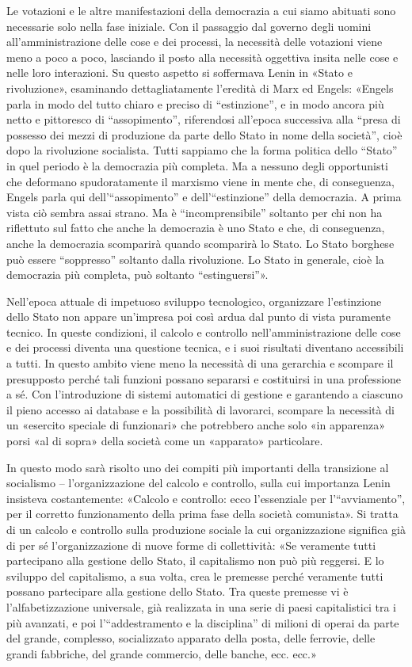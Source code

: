 \documentclass[12pt,a4paper,openany]{book}
\begin{document}
Le votazioni e le altre manifestazioni della democrazia a cui siamo abituati sono necessarie solo nella fase iniziale. Con il passaggio dal governo degli uomini all'amministrazione delle cose e dei processi, la necessità delle votazioni viene meno a poco a poco, lasciando il posto alla necessità oggettiva insita nelle cose e nelle loro interazioni. Su questo aspetto si soffermava Lenin in «Stato e rivoluzione», esaminando dettagliatamente l'eredità di Marx ed Engels: «Engels parla in modo del tutto chiaro e preciso di “estinzione”, e in modo ancora più netto e pittoresco di “assopimento”, riferendosi all'epoca successiva alla “presa di possesso dei mezzi di produzione da parte dello Stato in nome della società”, cioè dopo la rivoluzione socialista. Tutti sappiamo che la forma politica dello “Stato” in quel periodo è la democrazia più completa. Ma a nessuno degli opportunisti che deformano spudoratamente il marxismo viene in mente che, di conseguenza, Engels parla qui dell'“assopimento” e dell'“estinzione” della democrazia. A prima vista ciò sembra assai strano. Ma è “incomprensibile” soltanto per chi non ha riflettuto sul fatto che anche la democrazia è uno Stato e che, di conseguenza, anche la democrazia scomparirà quando scomparirà lo Stato. Lo Stato borghese può essere “soppresso” soltanto dalla rivoluzione. Lo Stato in generale, cioè la democrazia più completa, può soltanto “estinguersi”».

Nell'epoca attuale di impetuoso sviluppo tecnologico, organizzare l'estinzione dello Stato non appare un'impresa poi così ardua dal punto di vista puramente tecnico. In queste condizioni, il calcolo e controllo nell'amministrazione delle cose e dei processi diventa una questione tecnica, e i suoi risultati diventano accessibili a tutti. In questo ambito viene meno la necessità di una gerarchia e scompare il presupposto perché tali funzioni possano separarsi e costituirsi in una professione a sé. Con l'introduzione di sistemi automatici di gestione e garantendo a ciascuno il pieno accesso ai database e la possibilità di lavorarci, scompare la necessità di un «esercito speciale di funzionari» che potrebbero anche solo «in apparenza» porsi «al di sopra» della società come un «apparato» particolare.

In questo modo sarà risolto uno dei compiti più importanti della transizione al socialismo – l'organizzazione del calcolo e controllo, sulla cui importanza Lenin insisteva costantemente: «Calcolo e controllo: ecco l'essenziale per l'“avviamento”, per il corretto funzionamento della prima fase della società comunista». Si tratta di un calcolo e controllo sulla produzione sociale la cui organizzazione significa già di per sé l'organizzazione di nuove forme di collettività: «Se veramente tutti partecipano alla gestione dello Stato, il capitalismo non può più reggersi. E lo sviluppo del capitalismo, a sua volta, crea le premesse perché veramente tutti possano partecipare alla gestione dello Stato. Tra queste premesse vi è l'alfabetizzazione universale, già realizzata in una serie di paesi capitalistici tra i più avanzati, e poi l'“addestramento e la disciplina” di milioni di operai da parte del grande, complesso, socializzato apparato della posta, delle ferrovie, delle grandi fabbriche, del grande commercio, delle banche, ecc. ecc.»
\end{document}
